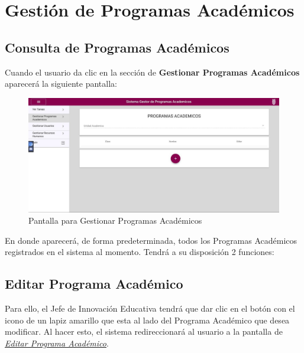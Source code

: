 
\chapter{Gestión de Programas Académicos}
    \section{Consulta de Programas Académicos}
        Cuando el usuario da clic en la sección de \textbf{Gestionar Programas Académicos} aparecerá la siguiente pantalla:


        \begin{figure}[!hbtp]
        	\centering
        	\hypertarget{consultarpa}{\includegraphics[width=0.7\linewidth]{images/SP3/ConsultarPA}}
        	\caption{Pantalla para Gestionar Programas Académicos}
        	\label{consultarpa}
        \end{figure}

        En donde aparecerá, de forma predeterminada, todos los Programas Académicos  registrados en el sistema al momento. Tendrá a su disposición 2 funciones:

	    \section{Editar Programa Académico}

        	Para ello, el Jefe de Innovación Educativa tendrá que dar clic en el botón con el icono de un lapiz amarillo que esta al lado del Programa Académico que desea modificar. Al hacer esto, el sistema redireccionará al usuario a la pantalla de \hyperlink{editarpa}{\textit{Editar Programa Académico}}.


